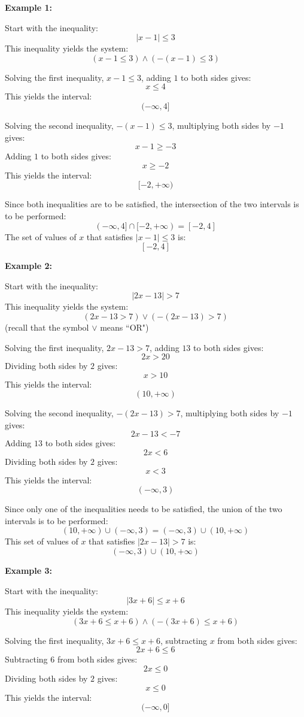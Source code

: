 \documentclass{article}
\begin{document}
\textbf{Example 1:}

Start with the inequality:
\[|x - 1| \leq 3\]
This inequality yields the system:
\[(x - 1 \leq 3) \wedge (-(x - 1) \leq 3)\]

Solving the first inequality, \(x - 1 \leq 3\), adding \(1\) to both sides gives:
\[x \leq 4\]
This yields the interval:
\[(-\infty, 4]\]

Solving the second inequality, \(-(x - 1) \leq 3\), multiplying both sides by \(-1\) gives:
\[x - 1 \geq -3\]
Adding \(1\) to both sides gives:
\[x \geq -2\]
This yields the interval:
\[[-2, +\infty)\]

Since both inequalities are to be satisfied, the intersection of the two intervals is to be performed:
\[(-\infty, 4] \cap [-2, +\infty) = [-2, 4]\]
The set of values of \(x\) that satisfies \(|x - 1| \leq 3\) is: 
\[[-2, 4]\]



\textbf{Example 2:}

Start with the inequality:
\[|2x - 13| > 7\]
This inequality yields the system:
\[(2x - 13 > 7) \vee (-(2x - 13) > 7)\]
(recall that the symbol \(\vee\) means ``OR")

Solving the first inequality, \(2x - 13 > 7\), adding \(13\) to both sides gives:
\[2x > 20\]
Dividing both sides by \(2\) gives:
\[x > 10\]
This yields the interval:
\[(10, +\infty)\]

Solving the second inequality, \(-(2x - 13) > 7\), multiplying both sides by \(-1\) gives:
\[2x - 13 < -7\]
Adding \(13\) to both sides gives:
\[2x < 6\]
Dividing both sides by \(2\) gives:
\[x < 3\]
This yields the interval:
\[(-\infty, 3)\]

Since only one of the inequalities needs to be satisfied, the union of the two intervals is to be performed:
\[(10, +\infty) \cup (-\infty, 3) = (-\infty, 3) \cup (10, +\infty)\]
This set of values of \(x\) that satisfies \(|2x - 13| > 7\) is:
\[(-\infty, 3) \cup (10, +\infty)\]



\textbf{Example 3:}

Start with the inequality:
\[|3x + 6| \leq x + 6\]
This inequality yields the system:
\[(3x + 6 \leq x + 6) \wedge (-(3x + 6) \leq x + 6)\]

Solving the first inequality, \(3x + 6 \leq x + 6\), subtracting \(x\) from both sides gives:
\[2x + 6 \leq 6\]
Subtracting \(6\) from both sides gives:
\[2x \leq 0\]
Dividing both sides by \(2\) gives:
\[x \leq 0\]
This yields the interval:
\[(-\infty, 0]\]
\end{document}
